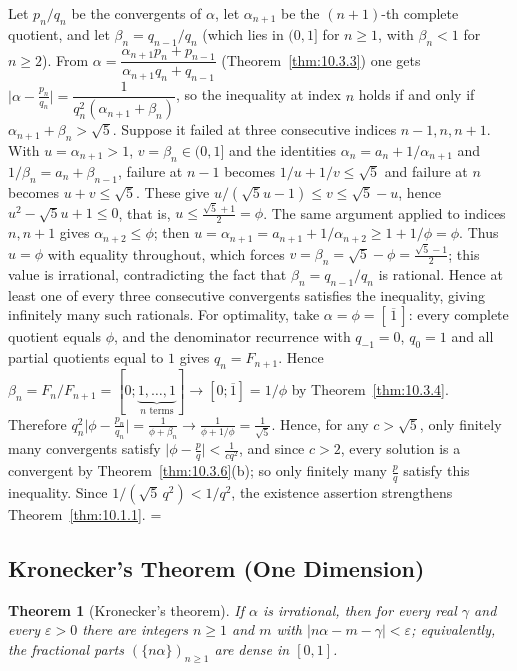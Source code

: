 \documentclass[11pt]{article}
\makeatletter
\let\nt@closedisplay\]
\def\nt@guardedclose{\@ifnextchar\par{\nt@closeafterpar}{\@ifnextchar\end{\postdisplaypenalty\@M\nt@closedisplay}{\nt@closedisplay}}}
\def\nt@closeafterpar\par{\@ifnextchar\par{\nt@closeafterpar}{\@ifnextchar\end{\postdisplaypenalty\@M\nt@closedisplay\par}{\nt@closedisplay\par}}}
\renewenvironment{proof}[1][\proofname]{\par
  \pushQED{\qed}\normalfont\topsep\medskipamount\edef\nt@afterproof{\@endparpenalty=\the\@endparpenalty\relax}\@beginparpenalty\@M\@endparpenalty\@M\let\]\nt@guardedclose\trivlist\item[]\textit{#1\@addpunct{.}} \ignorespaces}{\ifvmode\addpenalty\@M\fi\popQED\nt@afterproof\endtrivlist\@endpefalse}
\theoremstyle{ntstyle}
\newtheorem{theorem}{Theorem}[subsection]
\makeatother
\begin{document}
\begin{proof} Let $p_n/q_n$ be the convergents of
  $\alpha$, let $\alpha_{n+1}$ be the $(n+1)$-th complete quotient, and let
  $\beta_n=q_{n-1}/q_n$ (which lies in $(0,1]$ for $n\ge1$, with
  $\beta_n<1$ for $n\ge2$). From
  $\alpha=\dfrac{\alpha_{n+1}p_n+p_{n-1}}{\alpha_{n+1}q_n+q_{n-1}}$
  (Theorem~\ref{thm:10.3.3}) one gets
  $\big|\alpha-\tfrac{p_n}{q_n}\big|=\dfrac{1}{q_n^2(\alpha_{n+1}+\beta_n)}$,
  so the inequality at index $n$ holds if and only if
  $\alpha_{n+1}+\beta_n>\sqrt{5}$. Suppose it failed at three consecutive
  indices $n-1,n,n+1$. With $u=\alpha_{n+1}>1$, $v=\beta_n\in(0,1]$
  and the identities $\alpha_n=a_n+1/\alpha_{n+1}$ and $1/\beta_n=a_n+\beta_{n-1}$,
  failure at $n-1$ becomes $1/u+1/v\le\sqrt{5}$ and failure at $n$
  becomes $u+v\le\sqrt{5}$. These give $u/(\sqrt{5}u-1)\le v\le\sqrt{5}-u$,
  hence $u^2-\sqrt{5}u+1\le0$, that is, $u\le\tfrac{\sqrt{5}+1}{2}=\phi$. The
  same argument applied to indices $n,n+1$ gives $\alpha_{n+2}\le\phi$;
  then $u=\alpha_{n+1}=a_{n+1}+1/\alpha_{n+2}\ge1+1/\phi=\phi$. Thus
  $u=\phi$ with equality throughout, which forces
  $v=\beta_n=\sqrt{5}-\phi=\tfrac{\sqrt{5}-1}{2}$; this value is irrational,
  contradicting the fact that $\beta_n=q_{n-1}/q_n$ is rational. Hence at least
  one of every three consecutive convergents satisfies the inequality,
  giving infinitely many such rationals. For optimality, take
  $\alpha=\phi=[\,\overline1\,]$: every complete quotient equals $\phi$,
  and the denominator recurrence with $q_{-1}=0$, $q_0=1$ and all partial
  quotients equal to $1$ gives $q_n=F_{n+1}$. Hence
  $\beta_n=F_n/F_{n+1}=[0;\underbrace{1,\ldots,1}_{n\text{ terms}}]\to[0;\overline1]=1/\phi$
  by Theorem~\ref{thm:10.3.4}. Therefore
  $q_n^2\big|\phi-\tfrac{p_n}{q_n}\big|=\tfrac{1}{\phi+\beta_n}\to\tfrac{1}{\phi+1/\phi}=\tfrac{1}{\sqrt{5}}$.
  Hence, for any $c>\sqrt{5}$, only finitely many convergents satisfy
  $\big|\phi-\tfrac{p}{q}\big|<\tfrac{1}{cq^2}$, and since $c>2$, every
  solution is a convergent by Theorem~\ref{thm:10.3.6}(b); so only finitely many
  $\tfrac{p}{q}$ satisfy this inequality.
  Since $1/(\sqrt{5}\,q^2)<1/q^2$, the existence assertion strengthens
  Theorem~\ref{thm:10.1.1}.
\end{proof}
\subsection{Kronecker's Theorem (One Dimension)}

\begin{theorem}[Kronecker's theorem]\label{thm:10.6.1}\label{thm:kronecker-theorem}
  If $\alpha$ is
  irrational, then for every real $\gamma$ and every $\varepsilon>0$
  there are integers $n\ge1$ and $m$ with
  $|n\alpha-m-\gamma|<\varepsilon$; equivalently, the fractional parts
  $(\{n\alpha\})_{n\ge1}$ are dense in $[0,1]$.

\end{theorem}
\end{document}
